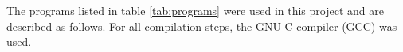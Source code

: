 The programs listed in table \ref{tab:programs} were used in this project and
are described as follows. For all compilation steps, the GNU C compiler (GCC)
was used.



